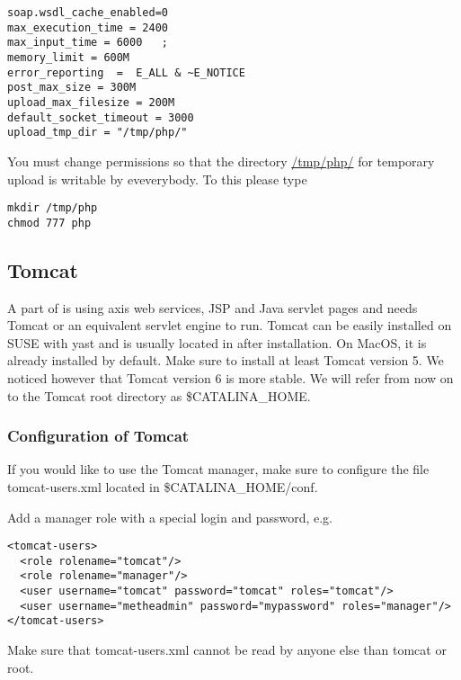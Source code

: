 \documentclass{book}
\begin{document}
\begin{footnotesize}
\begin{verbatim}
soap.wsdl_cache_enabled=0
max_execution_time = 2400
max_input_time = 6000	;
memory_limit = 600M
error_reporting  =  E_ALL & ~E_NOTICE
post_max_size = 300M
upload_max_filesize = 200M
default_socket_timeout = 3000
upload_tmp_dir = "/tmp/php/"
\end{verbatim}
\end{footnotesize}

You must change permissions so that the directory \url{/tmp/php/} for temporary upload is writable by eveverybody. To this please type

\begin{footnotesize}
\begin{verbatim}
mkdir /tmp/php
chmod 777 php
\end{verbatim}
\end{footnotesize}


\subsection{Tomcat}

A part of \neat is using axis web services, JSP and Java servlet pages and needs Tomcat
or an equivalent servlet engine to run.
Tomcat can be easily installed on SUSE with yast and is
usually located in  after installation.
On MacOS, it is already installed by default.
Make sure to install at least Tomcat version 5.
We noticed however that Tomcat version 6 is more stable.
We will refer from now on to the Tomcat root directory as \$CATALINA\_HOME.

\subsubsection{Configuration of Tomcat}
If you would like to use the Tomcat manager, make sure to configure the file
tomcat-users.xml located in \$CATALINA\_HOME/conf.

Add a manager role with a special login and password, e.g.
\begin{verbatim}
<tomcat-users>
  <role rolename="tomcat"/>
  <role rolename="manager"/>
  <user username="tomcat" password="tomcat" roles="tomcat"/>
  <user username="metheadmin" password="mypassword" roles="manager"/>
</tomcat-users>
\end{verbatim}

Make sure that tomcat-users.xml cannot be read by anyone else than tomcat or root.\\
\end{document}
